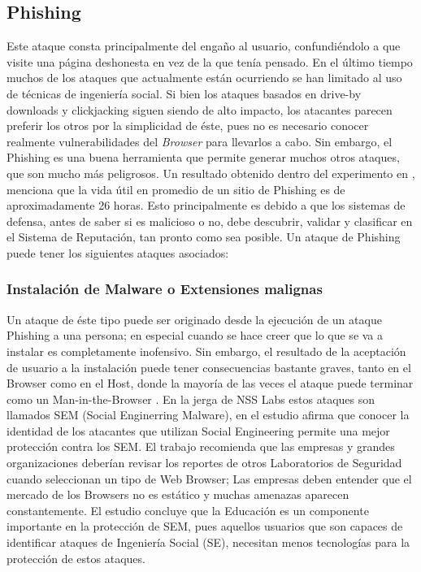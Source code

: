 \subsection{Phishing}
Este ataque consta principalmente del engaño al usuario, confundiéndolo a que visite una página deshonesta en vez de la que tenía pensado. En el último tiempo muchos de los ataques que actualmente están ocurriendo se han limitado al uso de técnicas de ingeniería social. Si bien los ataques basados en drive-by downloads y clickjacking siguen siendo de alto impacto, los atacantes parecen preferir los otros por la simplicidad de éste, pues no es necesario conocer realmente vulnerabilidades del \textit{Browser} para llevarlos a cabo. Sin embargo, el Phishing es una buena herramienta que permite generar muchos otros ataques, que son mucho más peligrosos. Un resultado obtenido dentro del experimento en \cite{browSecPhish}, menciona que la vida útil en promedio de un sitio de Phishing es de aproximadamente 26 horas. Esto principalmente es debido a que los sistemas de defensa, antes de saber si es malicioso o no, debe descubrir, validar y clasificar en el Sistema de Reputación, tan pronto como sea posible. Un ataque de Phishing puede tener los siguientes ataques asociados:

	\subsubsection{Instalación de Malware o Extensiones malignas}
	Un ataque de éste tipo puede ser originado desde la ejecución de un ataque Phishing a una persona; en especial cuando se hace creer que lo que se va a instalar es completamente inofensivo. Sin embargo, el resultado de la aceptación de usuario a la instalación puede tener consecuencias bastante graves, tanto en el Browser como en el Host, donde la mayoría de las veces el ataque puede terminar como un Man-in-the-Browser \cite{Utakrit2009, Dougan2012}. En la jerga de NSS Labs estos ataques son llamados SEM (Social Enginerring Malware), en el estudio \cite{rowSecSEMBlock} afirma que conocer la identidad de los atacantes que utilizan Social Engineering permite una mejor protección contra los SEM. El trabajo recomienda que las empresas y grandes organizaciones deberían revisar los reportes de otros Laboratorios de Seguridad cuando seleccionan un tipo de Web Browser; Las empresas deben entender que el mercado de los Browsers no es estático y muchas amenazas aparecen constantemente. El estudio concluye que la Educación es un componente importante en la protección de SEM, pues aquellos usuarios que son capaces de identificar ataques de Ingeniería Social (SE), necesitan menos tecnologías para la protección de estos ataques.

